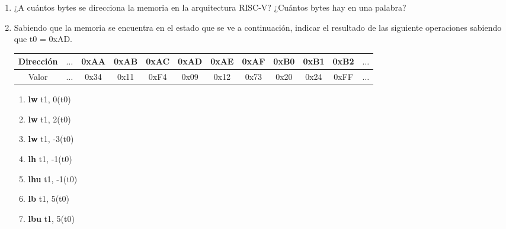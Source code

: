 \begin{enunciado}{\ejercicio}
        \begin{enumerate}
            \item ¿A cuántos bytes se direcciona la memoria en la arquitectura RISC-V? ¿Cuántos bytes
            hay en una palabra?
            \item Sabiendo que la memoria se encuentra en el estado que se ve a continuación, indicar el
            resultado de las siguiente operaciones sabiendo que t0 = 0xAD.
            
            \begin{center}
            \begin{tabular}{ |c|c|c|c|c|c|c|c|c|c|c|c|} 
                \hline
                Dirección & $\dots$ & 0xAA & 0xAB & 0xAC & 0xAD & 0xAE & 0xAF & 0xB0 & 0xB1 & 0xB2 & $\dots$ \\ 
                \hline
                Valor     & $\dots$ & 0x34 & 0x11 & 0xF4 & 0x09 & 0x12 & 0x73 & 0x20 & 0x24 & 0xFF & $\dots$ \\
                \hline
            \end{tabular}
            \end{center}

            \begin{multicols}{4}
                \begin{enumerate}
                    \item \textbf{lw} t1, 0(t0)
                    \item \textbf{lw} t1, 2(t0)
                    \item \textbf{lw} t1, -3(t0)
                    \item \textbf{lh} t1, -1(t0)
                    \item \textbf{lhu} t1, -1(t0)
                    \item \textbf{lb} t1, 5(t0)
                    \item \textbf{lbu} t1, 5(t0)
                \end{enumerate}
            \end{multicols}
        \end{enumerate}
    \end{enunciado}
    
